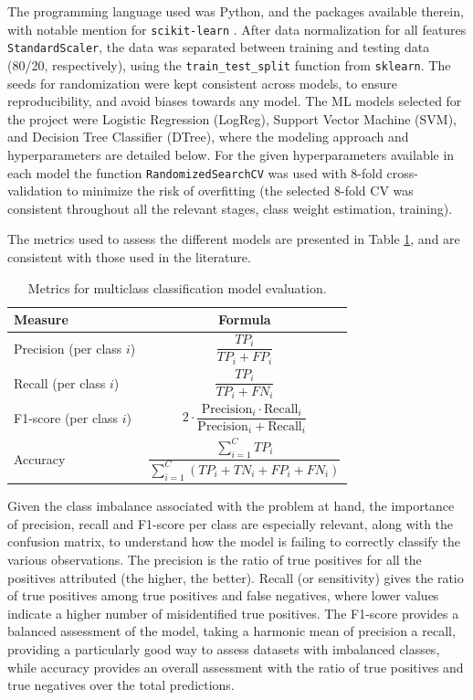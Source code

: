 \documentclass[conference]{IEEEtran}
\begin{document}
The programming language used was Python, and the packages available therein, with notable mention for \texttt{scikit-learn} \cite{scikit-learn}. After data normalization for all features \texttt{StandardScaler}, the data was separated between training and testing data (80/20, respectively), using the \texttt{train\_test\_split} function from \texttt{sklearn}. The seeds for randomization were kept consistent across models, to ensure reproducibility, and avoid biases towards any model. 
The ML models selected for the project were Logistic Regression (LogReg), Support Vector Machine (SVM), and Decision Tree Classifier (DTree), where the modeling approach and hyperparameters are detailed below. For the given hyperparameters available in each model the function \texttt{RandomizedSearchCV} was used with 8-fold cross-validation to minimize the risk of overfitting (the selected 8-fold CV was consistent throughout all the relevant stages, class weight estimation, training). 

The metrics used to assess the different models are presented in Table \ref{evaluationmetrics}, and are consistent with those used in the literature.

\begin{table}[H]
\centering
\caption{Metrics for multiclass classification model evaluation.}
\label{evaluationmetrics}
\begin{tabular}{lc}
\toprule
\textbf{Measure} & \textbf{Formula} \\
\midrule
Precision (per class $i$) & $\dfrac{TP_i}{TP_i + FP_i}$ \\[1em]
Recall (per class $i$) & $\dfrac{TP_i}{TP_i + FN_i}$ \\[1em]
F1-score (per class $i$) & $2 \cdot \dfrac{\text{Precision}_i \cdot \text{Recall}_i}{\text{Precision}_i + \text{Recall}_i}$ \\[1em] 
Accuracy & $\dfrac{\sum_{i=1}^{C} TP_i}{\sum_{i=1}^{C} (TP_i + TN_i + FP_i + FN_i)}$ \\[1em]
\bottomrule
\end{tabular}
\end{table}

Given the class imbalance associated with the problem at hand, the importance of precision, recall and F1-score per class are especially relevant, along with the confusion matrix, to understand how the model is failing to correctly classify the various observations. The precision is the ratio of true positives for all the positives attributed (the higher, the better). Recall (or sensitivity) gives the ratio of true positives among true positives and false negatives, where lower values indicate a higher number of misidentified true positives. The F1-score provides a balanced assessment of the model, taking a harmonic mean of precision a recall, providing a particularly good way to assess datasets with imbalanced classes, while accuracy provides an overall assessment with the ratio of true positives and true negatives over the total predictions.
\end{document}
